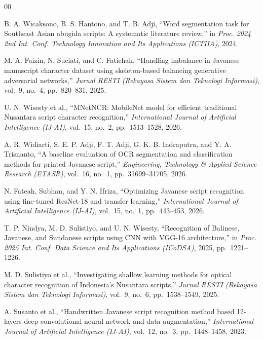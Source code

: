 \documentclass[conference]{IEEEtran}
\begin{document}
\begin{thebibliography}{00}


B. A. Wicaksono, B. S. Hantono, and T. B. Adji,
``Word segmentation task for Southeast Asian abugida scripts:
A systematic literature review,''
in \textit{Proc. 2024 2nd Int. Conf. Technology Innovation and
Its Applications (ICTIIA)}, 2024.

M. A. Faizin, N. Suciati, and C. Fatichah,
``Handling imbalance in Javanese manuscript character dataset
using skeleton-based balancing generative adversarial networks,''
\textit{Jurnal RESTI (Rekayasa Sistem dan Teknologi Informasi)},
vol.~9, no.~4, pp.~820--831, 2025.

U. N. Wisesty et al.,
``MNetNCR: MobileNet model for efficient traditional Nusantara
script character recognition,''
\textit{International Journal of Artificial Intelligence (IJ-AI)},
vol.~15, no.~2, pp.~1513--1528, 2026.

A. R. Widiarti, S. E. P. Adji, F. T. Adji, G. K. B. Indraputra,
and Y. A. Trisnanto,
``A baseline evaluation of OCR segmentation and classification
methods for printed Javanese script,''
\textit{Engineering, Technology \& Applied Science Research (ETASR)},
vol.~16, no.~1, pp.~31699--31705, 2026.

N. Fateah, Subhan, and Y. N. Ifriza,
``Optimizing Javanese script recognition using fine-tuned ResNet-18
and transfer learning,''
\textit{International Journal of Artificial Intelligence (IJ-AI)},
vol.~15, no.~1, pp.~443--453, 2026.

T. P. Nindya, M. D. Sulistiyo, and U. N. Wisesty,
``Recognition of Balinese, Javanese, and Sundanese scripts
using CNN with VGG-16 architecture,''
in \textit{Proc. 2025 Int. Conf. Data Science and Its Applications
(ICoDSA)}, 2025, pp.~1221--1226.

M. D. Sulistiyo et al.,
``Investigating shallow learning methods for optical character
recognition of Indonesia's Nusantara scripts,''
\textit{Jurnal RESTI (Rekayasa Sistem dan Teknologi Informasi)},
vol.~9, no.~6, pp.~1538--1549, 2025.

A. Susanto et al.,
``Handwritten Javanese script recognition method based 12-layers
deep convolutional neural network and data augmentation,''
\textit{International Journal of Artificial Intelligence (IJ-AI)},
vol.~12, no.~3, pp.~1448--1458, 2023.


\end{thebibliography}
\end{document}
